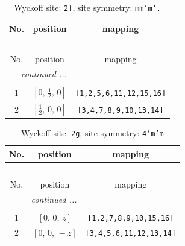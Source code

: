 \documentclass[fleqn,8pt]{jsarticle}
\begin{document}
\renewcommand{\arraystretch}{1.2}
\begin{longtable}{ccc}
\caption{Wyckoff site: {\tt 2f}, site symmetry: {\tt mm'm'.}}
 \\
 \hline \hline
No. & position & mapping \\ \hline \endfirsthead

\multicolumn{2}{l}{\tablename\ \thetable{}} \\
 \hline \hline
No. & position & mapping \\ \hline \endhead

 \hline \hline
\multicolumn{2}{r}{\footnotesize\it continued ...} \\ \endfoot

 \hline \hline
\multicolumn{2}{r}{} \\ \endlastfoot

1 & $\left[ 0,\, \frac{1}{2},\, 0 \right]$ & {\tt [1,2,5,6,11,12,15,16]} \\ \hline
2 & $\left[ \frac{1}{2},\, 0,\, 0 \right]$ & {\tt [3,4,7,8,9,10,13,14]} \\
\end{longtable}
\renewcommand{\arraystretch}{1.2}
\begin{longtable}{ccc}
\caption{Wyckoff site: {\tt 2g}, site symmetry: {\tt 4'm'm}}
 \\
 \hline \hline
No. & position & mapping \\ \hline \endfirsthead

\multicolumn{2}{l}{\tablename\ \thetable{}} \\
 \hline \hline
No. & position & mapping \\ \hline \endhead

 \hline \hline
\multicolumn{2}{r}{\footnotesize\it continued ...} \\ \endfoot

 \hline \hline
\multicolumn{2}{r}{} \\ \endlastfoot

1 & $\left[ 0,\, 0,\, z \right]$ & {\tt [1,2,7,8,9,10,15,16]} \\ \hline
2 & $\left[ 0,\, 0,\, - z \right]$ & {\tt [3,4,5,6,11,12,13,14]} \\
\end{longtable}
\renewcommand{\arraystretch}{1.2}
\end{document}
